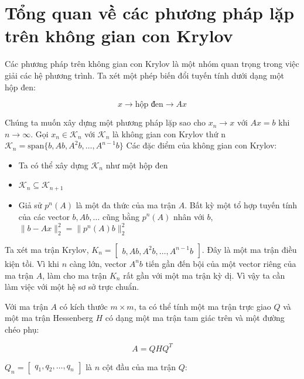 \documentclass[14pt, a4paper]{article}
\numberwithin{equation}{section}
\numberwithin{algorithm}{section}
\numberwithin{figure}{section}
\numberwithin{dl}{section}
\numberwithin{md}{section}
\numberwithin{bd}{section}
\numberwithin{dn}{section}
\begin{document}
\section{Tổng quan về các phương pháp lặp trên không gian con Krylov}

Các phương pháp trên không gian con Krylov là một nhóm quan trọng trong việc giải các hệ phương trình. Ta xét một phép biến đổi tuyến tính dưới dạng một hộp đen:

\begin{equation}
    x \rightarrow \boxed{\text{hộp đen}} \rightarrow Ax
\end{equation}

Chúng ta muốn xây dựng một phương pháp lặp sao cho $x_n \rightarrow x$ với $Ax=b$ khi $n \rightarrow \infty$. Gọi $x_n \in \mathcal{K}_n$ với $\mathcal{K}_n$ là không gian con Krylov thứ n $\mathcal{K}_n=\mathrm{span} \lbrace b, Ab, A^2b, \dots, A^{n-1}b \rbrace$
Các đặc điểm của không gian con Krylov:
\begin{itemize}
    \item Ta có thể xây dựng $\mathcal{K}_n$ như một hộp đen
    \item $\mathcal{K}_n \subseteq \mathcal{K}_{n+1}$
    \item Giả sử $p^n(A)$ là một đa thức của ma trận $A$. Bất kỳ một tổ hợp tuyến tính của các vector $b, Ab, \dots$ cũng bằng $p^n(A)$ nhân với $b$, $\lVert b - Ax \rVert_2^2 = \lVert p^n(A)b \rVert_2^2$
\end{itemize}

Ta xét ma trận Krylov, $K_n = \begin{bmatrix} b, Ab, A^2b, \dots, A^{n-1}b \end{bmatrix}$. Đây là một ma trận điều kiện tồi. Vì khi $n$ càng lớn, vector $A^nb$ tiến gần đến bội của một vector riêng của ma trận $A$, làm cho ma trận $K_n$ rất gần với một ma trận kỳ dị. Vì vậy ta cần làm việc với một hệ sơ sở trực chuẩn.

Với ma trận $A$ có kích thước $m \times m$, ta có thể tính một ma trận trực giao $Q$ và một ma trận Hessenberg $H$ có dạng một ma trận tam giác trên và một đường chéo phụ:

\begin{equation} \label{eq:AQHQ}
    A = QHQ^T
\end{equation}

$Q_n=\begin{bmatrix} q_1, q_2, \dots, q_n \end{bmatrix}$ là $n$ cột đầu của ma trận $Q$:
\end{document}

